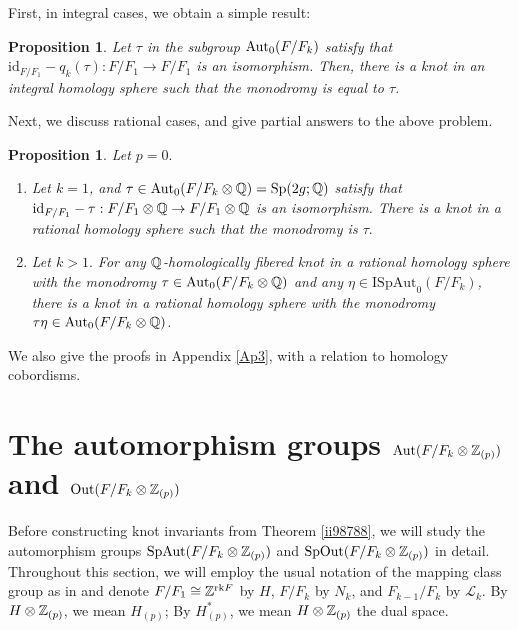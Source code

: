 \documentclass{article}
\theoremstyle{plain}
\newtheorem{prop}[thm]{Proposition}
\theoremstyle{definition}
\def\Qer{\mathop{\mathrm{Ker}}\nolimits}
\newcommand{\ra}{\rightarrow}
\newcommand{\Q}{{\Bbb Q}}
\newcommand{\Z}{{\Bbb Z}}
\newcommand{\Aut}{{\rm Aut}}
\newcommand{\Sp}{{\rm Sp}}
\begin{document}
{First,
in integral cases, we obtain a simple result:
\begin{prop}\label{llk145}
Let $\tau $ in the subgroup $ \Aut_0 (F/F_k)$ satisfy that
$ \mathrm{id}_{F/F_1}- q_k ( \tau) : F/F_1 \ra F/F_1$ is an isomorphism.
Then,
there is a knot in an integral homology sphere such that the monodromy is equal to $\tau$.
\end{prop}
Next, we discuss rational cases, and give partial answers to the above problem.
\begin{prop}\label{llk1456}Let $p=0.$
\begin{enumerate}[(1)]
\item Let $k=1$, and $\tau \in \Aut_0 (F/F_k \otimes \Q) =\Sp(2g;\Q) $ satisfy that
$ \mathrm{id}_{F/F_1}- \tau : F/F_1\otimes \Q \ra F/F_1\otimes \Q$ is an isomorphism.
There is a knot in a rational homology sphere such that the monodromy is $\tau.$
\item Let $k>1. $ For any $\Q$-homologically fibered knot in a rational homology sphere with the monodromy $\tau \in \Aut_0 (F/F_k \otimes \Q) $ and any $ \eta \in \mathrm{ISpAut}_0 (F/F_k)$,
there is a knot in a rational homology sphere with the monodromy $\tau \eta \in \Aut_0 (F/F_k \otimes \Q) $.
\end{enumerate}
\end{prop}
We also give the proofs in Appendix \ref {Ap3}, with a relation to homology cobordisms.



\section{The automorphism groups $ \mathrm{Aut}( F/F_k \otimes \Z_{(p)})$ and $ \mathrm{Out}( F/F_k \otimes \Z_{(p)})$ }
\label{9914}
Before constructing knot invariants from Theorem \ref{ii98788}, we will study the automorphism groups $ \mathrm{SpAut}( F/F_k \otimes \Z_{(p)})$ and $ \mathrm{SpOut}( F/F_k \otimes \Z_{(p)})$ in detail. Throughout this section, we will employ the usual notation of the mapping class group as in \cite{DJ, ES, Mo, Mo2, Sa} and denote $F/F_1 \cong \Z^{\mathrm{rk} F}$ by $ H$, $F/F_k $ by $ N_k$, and $F_{k-1}/F_{k} $ by $ \mathcal{L}_k$. By $H \otimes \Z_{(p)}$, we mean $H_{(p)}$; By $H_{(p)}^* $, we mean $H \otimes \Z_{(p)} $ the dual space.

}
\end{document}

